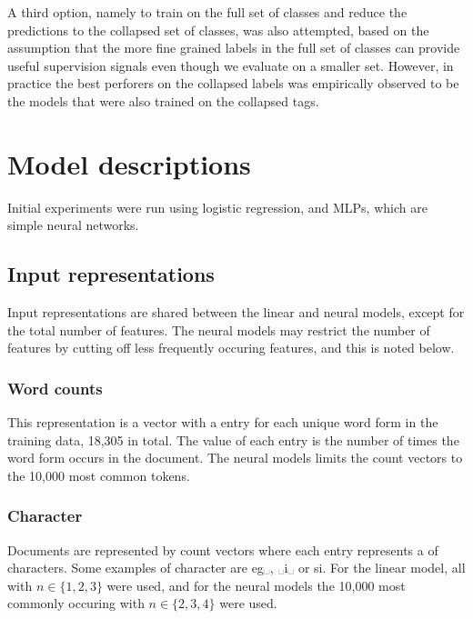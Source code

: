 A third option, namely to train on the full set of classes and reduce the
predictions to the collapsed set of classes, was also attempted, based on the
assumption that the more fine grained labels in the full set of classes can
provide useful supervision signals even though we evaluate on a smaller set.
However, in practice the best perforers on the collapsed labels was
empirically observed to be the models that were also trained on the collapsed
tags.


\section{Model descriptions}

Initial experiments were run using logistic regression, and \acp{MLP}, which
are simple neural networks.

\subsection{Input representations}

Input representations are shared between the linear and neural models, except
for the total number of features. The neural models may restrict the number
of features by cutting off less frequently occuring features, and this is
noted below.

\subsubsection*{Word counts}

This representation is a vector with a entry for each unique word form in the
training data, 18,305 in total. The value of each entry is the number of
times the word form occurs in the document. The neural models limits the
count vectors to the 10,000 most common tokens.

\subsubsection*{Character \ngrams}

Documents are represented by count vectors where each entry represents a
\ngram of characters. Some examples of character \ngrams are \textlangle
eg␣\textrangle, \textlangle␣i␣\textrangle\xspace or \textlangle si\textrangle. For
the linear model, all \ngrams with $n\in \{1,2,3\}$ were used, and for the
neural models the 10,000 most commonly occuring \ngrams with $n\in \{2,3,4\}$
were used.

